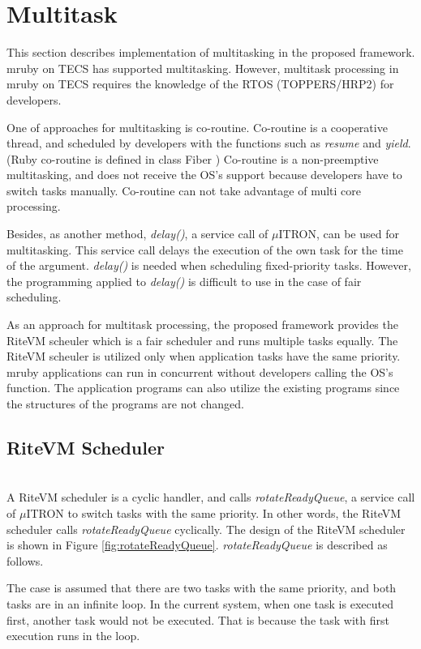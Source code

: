 \documentclass[a4j,12pt,oneside,openany,english]{jsbook}
\begin{document}
\section{Multitask}
\label{sec:Multitask}
This section describes implementation of multitasking in the proposed framework.
mruby on TECS has supported multitasking.
However, multitask processing in mruby on TECS requires the knowledge of the RTOS (TOPPERS/HRP2) for developers.

One of approaches for multitasking is co-routine.
Co-routine is a cooperative thread, and scheduled by developers with the functions such as {\it resume} and {\it yield}. 
(Ruby co-routine is defined in class Fiber \cite{url:co-routine})
Co-routine is a non-preemptive multitasking, and does not receive the OS's support because developers have to switch tasks manually.
Co-routine can not take advantage of multi core processing.

Besides, as another method, {\it delay()}, a service call of $\mu$ITRON, can be used for multitasking.
This service call delays the execution of the own task for the time of the argument.
{\it delay()} is needed when scheduling fixed-priority tasks.
However, the programming applied to {\it delay()} is difficult to use in the case of fair scheduling.

As an approach for multitask processing, the proposed framework provides the RiteVM scheuler which is a fair scheduler and runs multiple tasks equally.
The RiteVM scheuler is utilized only when application tasks have the same priority.
mruby applications can run in concurrent without developers calling the OS's function.
The application programs can also utilize the existing programs since the structures of the programs are not changed. 

\subsection{RiteVM Scheduler} \mbox{}\\

A RiteVM scheduler is a cyclic handler, and calls {\it rotateReadyQueue}, a service call of $\mu$ITRON to switch tasks with the same priority.
In other words, the RiteVM scheduler calls {\it rotateReadyQueue} cyclically.
The design of the RiteVM scheduler is shown in Figure \ref{fig:rotateReadyQueue}. 
{\it rotateReadyQueue} is described as follows.

The case is assumed that there are two tasks with the same priority, and both tasks are in an infinite loop.
In the current system, when one task is executed first, another task would not be executed.
That is because the task with first execution runs in the loop.
\end{document}
